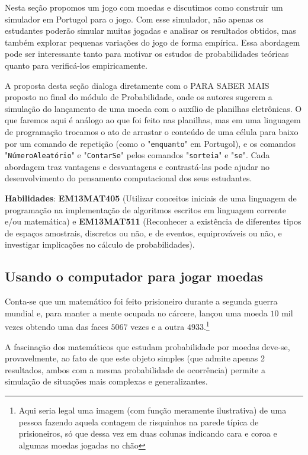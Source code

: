 \label{comp-exp8}
\begin{texto}
{
Nesta seção propomos um jogo com moedas e discutimos como construir um simulador em Portugol para o jogo. Com esse simulador, não apenas os estudantes poderão simular muitas jogadas e analisar os resultados obtidos, mas também explorar pequenas variações do jogo de forma empírica. Essa abordagem pode ser interessante tanto para motivar os estudos de probabilidades teóricas quanto para verificá-los empiricamente.

A proposta desta seção dialoga diretamente com o PARA SABER MAIS proposto no final do módulo de Probabilidade, onde os autores sugerem a simulação do lançamento de uma moeda com o auxílio de planilhas eletrônicas. O que faremos aqui é análogo ao que foi feito nas planilhas, mas em uma linguagem de programação trocamos o ato de arrastar o conteúdo de uma célula para baixo por um comando de repetição (como o "\texttt{enquanto}"{} em Portugol), e os comandos "\texttt{NúmeroAleatório}"{} e "\texttt{ContarSe}"{} pelos comandos "\texttt{sorteia}"{} e "\texttt{se}". Cada abordagem traz vantagens e desvantagens e contrastá-las pode ajudar no desenvolvimento do pensamento computacional dos seus estudantes.

\textbf{Habilidades}: \textbf{EM13MAT405} (Utilizar conceitos iniciais de uma linguagem de programação na implementação de algoritmos escritos em linguagem corrente e/ou matemática) e \textbf{EM13MAT511} (Reconhecer a existência de diferentes tipos de espaços amostrais, discretos ou não, e de eventos, equiprováveis ou não, e investigar implicações no cálculo de probabilidades).

}
\end{texto}

\subsection{Usando o computador para jogar moedas}

Conta-se que um matemático foi feito prisioneiro durante a segunda guerra mundial e, para manter a mente ocupada no cárcere, lançou uma moeda $10$ mil vezes obtendo uma das faces $5067$ vezes e a outra $4933$.\footnote{Aqui seria legal uma imagem (com função meramente ilustrativa) de uma pessoa fazendo aquela contagem de risquinhos na parede típica de prisioneiros, só que dessa vez em duas colunas indicando cara e coroa e algumas moedas jogadas no chão}

A fascinação dos matemáticos que estudam probabilidade por moedas deve-se, provavelmente, ao fato de que este objeto simples (que admite apenas 2 resultados, ambos com a mesma probabilidade de ocorrência) permite a simulação de situações mais complexas e generalizantes.


